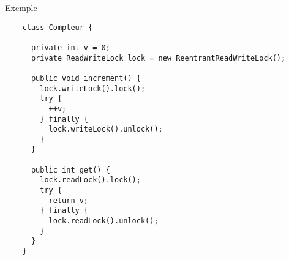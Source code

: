 
\begingroup

\begin{frame}[fragile]{Exemple}
  \begin{lstlisting}
    class Compteur {
      
      private int v = 0;
      private ReadWriteLock lock = new ReentrantReadWriteLock();
      
      public void increment() {
        lock.writeLock().lock();
        try {
          ++v;
        } finally {
          lock.writeLock().unlock();
        }
      }
      
      public int get() {
        lock.readLock().lock();
        try {
          return v;
        } finally {
          lock.readLock().unlock();
        }
      }
    }
  \end{lstlisting}
\end{frame}

\endgroup
\endinput
